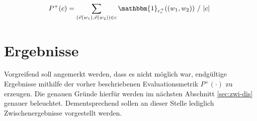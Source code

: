 \begin{equation}
  P^+(c) = \sum_{(\vec{v}(w_1), \vec{v}(w_2)) \in c} \mathbbm{1}_{r_c^+}((w_1, w_2))\ /\ |c|
\end{equation}

\section{Ergebnisse}

Vorgreifend soll angemerkt werden, dass es nicht möglich war, endgültige Ergebnisse mithilfe der vorher beschriebenen
Evaluationsmetrik $P^+(\cdot)$ zu erzeugen. Die genauen Gründe hierfür werden im nächsten Abschnitt \ref{sec:zwi-dis}
genauer beleuchtet. Dementsprechend sollen an dieser Stelle lediglich Zwischenergebnisse vorgestellt werden.\\

